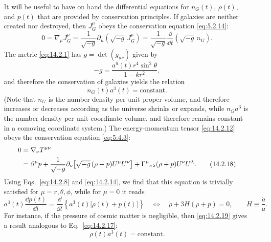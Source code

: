 It will be useful to have on hand the differential equations for
\(n_G(t)\), \(\rho(t)\), and \(p(t)\) that are provided by conservation
principles. If galaxies are neither created nor destroyed, then \(J_G^\mu\)
obeys the conservation equation \eqref{eq:5.2.14}:
\begin{equation}
  0
  =
  \nabla_\mu J_G^\mu
  =
  \frac{1}{\sqrt{-g}}
  \partial_\mu\!\left(\sqrt{-g}\,J_G^\mu\right)
  =
  \frac{1}{\sqrt{-g}}
  \frac{\dd}{\dd t}\!\left(\sqrt{-g}\,n_G\right).
  \tag{14.2.15}\label{eq:14.2.15}
\end{equation}
The metric \eqref{eq:14.2.1} has \(g=\det(g_{\mu\nu})\) given by
\begin{equation}
  -g
  =
  \frac{a^6(t)r^4\sin^2\theta}{1-kr^2},
  \tag{14.2.16}\label{eq:14.2.16}
\end{equation}
and therefore the conservation of galaxies yields the relation
\begin{equation}
  n_G(t)a^3(t)=\text{constant}.
  \tag{14.2.17}\label{eq:14.2.17}
\end{equation}
(Note that \(n_G\) is the number density per unit proper volume, and
therefore increases or decreases according as the universe shrinks or
expands, while \(n_Ga^3\) is the number density per unit coordinate volume,
and therefore remains constant in a comoving coordinate system.) The
energy-momentum tensor \eqref{eq:14.2.12} obeys the conservation equation
\eqref{eq:5.4.3}:
\begin{align}
  0
  ={}&
  \nabla_\nu T^{\mu\nu}
  \notag\\
  ={}&
  \partial^\mu p
  +\frac{1}{\sqrt{-g}}
   \partial_\nu\!\left[
     \sqrt{-g}\,(\rho+p)U^\mu U^\nu
   \right]
  +\Gamma^\mu{}_{\nu\lambda}
   (\rho+p)U^\nu U^\lambda.
  \tag{14.2.18}\label{eq:14.2.18}
\end{align}
Using Eqs.~\eqref{eq:14.2.8} and \eqref{eq:14.2.14}, we find that this
equation is trivially satisfied for \(\mu=r,\theta,\phi\), while for
\(\mu=0\) it reads
\begin{equation}
  a^3(t)\frac{\dd p(t)}{\dd t}
  =
  \frac{\dd}{\dd t}
  \left\{
    a^3(t)\bigl[\rho(t)+p(t)\bigr]
  \right\}
  \quad\Longleftrightarrow\quad
  \dot\rho+3H(\rho+p)=0,
  \qquad
  H\equiv\frac{\dot a}{a}.
  \tag{14.2.19}\label{eq:14.2.19}
\end{equation}
For instance, if the pressure of cosmic matter is negligible, then
\eqref{eq:14.2.19} gives a result analogous to
Eq.~\eqref{eq:14.2.17}:
\begin{equation}
  \rho(t)a^3(t)=\text{constant}.
  \tag{14.2.20}\label{eq:14.2.20}
\end{equation}

